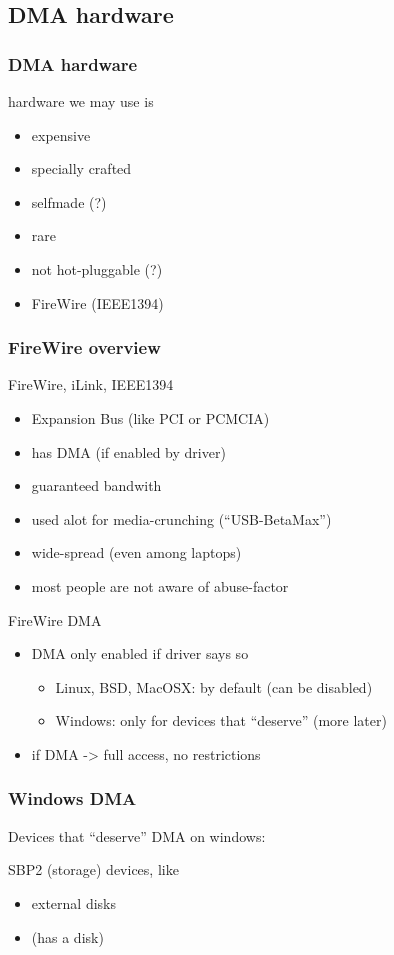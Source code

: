 \documentclass{beamer}
\newenvironment{itemizeframe}[1]
  {\begin{frame}{#1}\startitemizeframe}
  {\stopitemizeframe\end{frame}}
\newcommand\startitemizeframe{\begin{itemize}}
\newcommand\stopitemizeframe{\end{itemize}}
\begin{document}
	\subsection{DMA hardware}

		\begin{frame} \frametitle{DMA hardware}
			hardware we may use is
			\begin{itemize}
				\item expensive
				\item specially crafted
				\item selfmade (?)
				\item rare
				\item not hot-pluggable (?)
				\item {} FireWire (IEEE1394)
			\end{itemize}
		\end{frame}

		\begin{frame} \frametitle{FireWire overview}
			 FireWire, iLink, IEEE1394
			\begin{itemize}
				\item Expansion Bus (like PCI or PCMCIA)
				\item has DMA (if enabled by driver)
				\item guaranteed bandwith
				\item used alot for media-crunching ("`USB-BetaMax"')
				\item wide-spread (even among laptops)
				\item most people are not aware of abuse-factor
			\end{itemize}
		\end{frame}

		\begin{itemizeframe}{FireWire DMA}
			\item DMA only enabled if driver says so
			\begin{itemize}
				\item Linux, BSD, MacOSX: by default (can be disabled)
				\item Windows: only for devices that "`deserve"' (more later)
			\end{itemize}
			\item if DMA -> full access, no restrictions
		\end{itemizeframe}

		\begin{frame} \frametitle{Windows DMA}
			Devices that "`deserve"' DMA on windows:

			SBP2 (storage) devices, like
			\begin{itemize}
				\item external disks
				\item {} (has a disk)
			\end{itemize}

		\end{frame}
		
\end{document}
